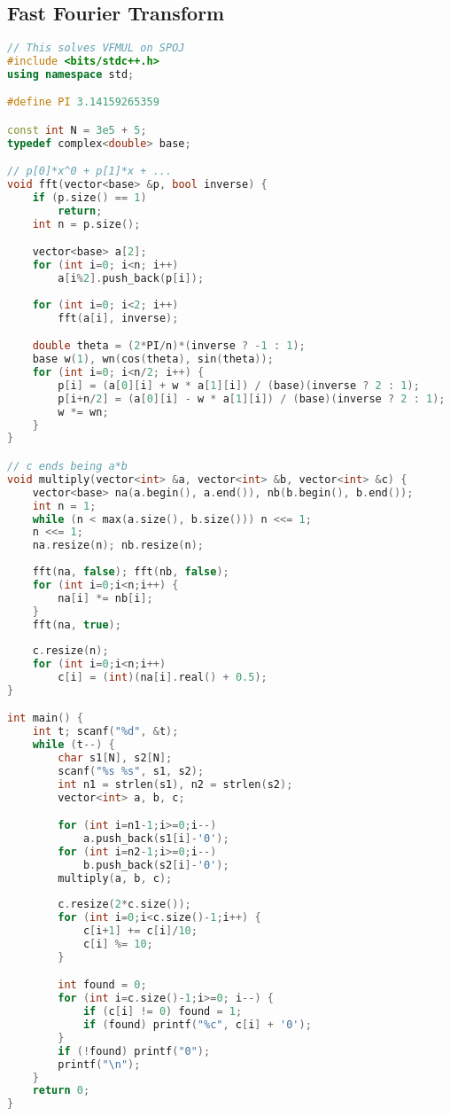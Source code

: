 \documentclass{article}
\begin{document}
\subsection{Fast Fourier Transform}
\begin{lstlisting}[language=C++]
// This solves VFMUL on SPOJ
#include <bits/stdc++.h>
using namespace std;

#define PI 3.14159265359

const int N = 3e5 + 5;
typedef complex<double> base;

// p[0]*x^0 + p[1]*x + ...
void fft(vector<base> &p, bool inverse) {
	if (p.size() == 1)
		return;
	int n = p.size();

	vector<base> a[2];
	for (int i=0; i<n; i++) 
		a[i%2].push_back(p[i]);
	
	for (int i=0; i<2; i++)
		fft(a[i], inverse);

	double theta = (2*PI/n)*(inverse ? -1 : 1);
	base w(1), wn(cos(theta), sin(theta));
	for (int i=0; i<n/2; i++) {
		p[i] = (a[0][i] + w * a[1][i]) / (base)(inverse ? 2 : 1);
		p[i+n/2] = (a[0][i] - w * a[1][i]) / (base)(inverse ? 2 : 1);
		w *= wn;
	}
}

// c ends being a*b
void multiply(vector<int> &a, vector<int> &b, vector<int> &c) {
	vector<base> na(a.begin(), a.end()), nb(b.begin(), b.end());
	int n = 1;
	while (n < max(a.size(), b.size())) n <<= 1;
	n <<= 1;
	na.resize(n); nb.resize(n);
	
	fft(na, false); fft(nb, false);
	for (int i=0;i<n;i++) {
		na[i] *= nb[i];	
	}
	fft(na, true);
	
	c.resize(n);
	for (int i=0;i<n;i++)
		c[i] = (int)(na[i].real() + 0.5);
}

int main() {
	int t; scanf("%d", &t);
	while (t--) {
		char s1[N], s2[N];
		scanf("%s %s", s1, s2);
		int n1 = strlen(s1), n2 = strlen(s2);
		vector<int> a, b, c;

		for (int i=n1-1;i>=0;i--)
			a.push_back(s1[i]-'0');
		for (int i=n2-1;i>=0;i--)
			b.push_back(s2[i]-'0');
		multiply(a, b, c);
		
		c.resize(2*c.size());
		for (int i=0;i<c.size()-1;i++) {
			c[i+1] += c[i]/10;
			c[i] %= 10;
		}

		int found = 0;
		for (int i=c.size()-1;i>=0; i--) {
			if (c[i] != 0) found = 1;
			if (found) printf("%c", c[i] + '0');
		}
		if (!found) printf("0");
		printf("\n");
	}
    return 0;
}

\end{lstlisting}
\end{document}
